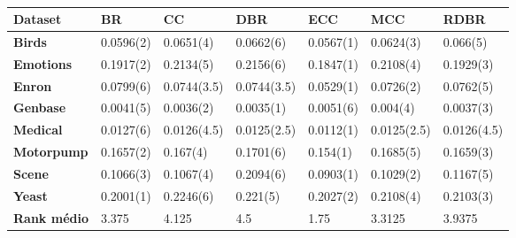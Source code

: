 \begin{table}[\tabmode]
\begin{tabular}{lllllll}
\hline
\textbf{Dataset}    & \textbf{BR} & \textbf{CC} & \textbf{DBR} & \textbf{ECC} & \textbf{MCC} & \textbf{RDBR} \\ \hline
\textbf{Birds}      & 0.0596(2)   & 0.0651(4)   & 0.0662(6)    & 0.0567(1)    & 0.0624(3)    & 0.066(5)      \\
\textbf{Emotions}   & 0.1917(2)   & 0.2134(5)   & 0.2156(6)    & 0.1847(1)    & 0.2108(4)    & 0.1929(3)     \\
\textbf{Enron}      & 0.0799(6)   & 0.0744(3.5) & 0.0744(3.5)  & 0.0529(1)    & 0.0726(2)    & 0.0762(5)     \\
\textbf{Genbase}    & 0.0041(5)   & 0.0036(2)   & 0.0035(1)    & 0.0051(6)    & 0.004(4)     & 0.0037(3)     \\
\textbf{Medical}    & 0.0127(6)   & 0.0126(4.5) & 0.0125(2.5)  & 0.0112(1)    & 0.0125(2.5)  & 0.0126(4.5)   \\
\textbf{Motorpump}  & 0.1657(2)   & 0.167(4)    & 0.1701(6)    & 0.154(1)     & 0.1685(5)    & 0.1659(3)     \\
\textbf{Scene}      & 0.1066(3)   & 0.1067(4)   & 0.2094(6)    & 0.0903(1)    & 0.1029(2)    & 0.1167(5)     \\
\textbf{Yeast}      & 0.2001(1)   & 0.2246(6)   & 0.221(5)     & 0.2027(2)    & 0.2108(4)    & 0.2103(3)     \\ \hline
\textbf{Rank médio} & 3.375       & 4.125       & 4.5          & 1.75         & 3.3125       & 3.9375        \\ \hline
\end{tabular}
\caption{}
\label{tab:HLsvm}
\end{table}